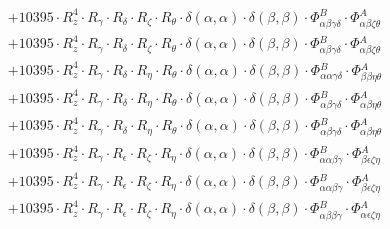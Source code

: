 \documentclass{article}
\begin{document}
\begin{subequations}
\begin{gather}
\begin{array}{c}
 \\[0.2em] 		 + 10395 \cdot R_{z}^{4} \cdot R_{\gamma{}} \cdot R_{\delta{}} \cdot R_{\zeta{}} \cdot R_{\theta{}} \cdot \delta{}\left(\alpha{}, \alpha{}\right) \cdot \delta{}\left(\beta{}, \beta{}\right) \cdot \Phi{}^{B}_{\alpha{}\beta{}\gamma{}\delta{}} \cdot \Phi{}^{A}_{\alpha{}\beta{}\zeta{}\theta{}} 
 \\[0.2em] 		 + 10395 \cdot R_{z}^{4} \cdot R_{\gamma{}} \cdot R_{\delta{}} \cdot R_{\zeta{}} \cdot R_{\theta{}} \cdot \delta{}\left(\alpha{}, \alpha{}\right) \cdot \delta{}\left(\beta{}, \beta{}\right) \cdot \Phi{}^{B}_{\alpha{}\beta{}\gamma{}\delta{}} \cdot \Phi{}^{A}_{\alpha{}\beta{}\zeta{}\theta{}} 
 \\[0.2em] 		 + 10395 \cdot R_{z}^{4} \cdot R_{\gamma{}} \cdot R_{\delta{}} \cdot R_{\eta{}} \cdot R_{\theta{}} \cdot \delta{}\left(\alpha{}, \alpha{}\right) \cdot \delta{}\left(\beta{}, \beta{}\right) \cdot \Phi{}^{B}_{\alpha{}\alpha{}\gamma{}\delta{}} \cdot \Phi{}^{A}_{\beta{}\beta{}\eta{}\theta{}} 
 \\[0.2em] 		 + 10395 \cdot R_{z}^{4} \cdot R_{\gamma{}} \cdot R_{\delta{}} \cdot R_{\eta{}} \cdot R_{\theta{}} \cdot \delta{}\left(\alpha{}, \alpha{}\right) \cdot \delta{}\left(\beta{}, \beta{}\right) \cdot \Phi{}^{B}_{\alpha{}\beta{}\gamma{}\delta{}} \cdot \Phi{}^{A}_{\alpha{}\beta{}\eta{}\theta{}} 
 \\[0.2em] 		 + 10395 \cdot R_{z}^{4} \cdot R_{\gamma{}} \cdot R_{\delta{}} \cdot R_{\eta{}} \cdot R_{\theta{}} \cdot \delta{}\left(\alpha{}, \alpha{}\right) \cdot \delta{}\left(\beta{}, \beta{}\right) \cdot \Phi{}^{B}_{\alpha{}\beta{}\gamma{}\delta{}} \cdot \Phi{}^{A}_{\alpha{}\beta{}\eta{}\theta{}} 
 \\[0.2em] 		 + 10395 \cdot R_{z}^{4} \cdot R_{\gamma{}} \cdot R_{\epsilon{}} \cdot R_{\zeta{}} \cdot R_{\eta{}} \cdot \delta{}\left(\alpha{}, \alpha{}\right) \cdot \delta{}\left(\beta{}, \beta{}\right) \cdot \Phi{}^{B}_{\alpha{}\alpha{}\beta{}\gamma{}} \cdot \Phi{}^{A}_{\beta{}\epsilon{}\zeta{}\eta{}} 
 \\[0.2em] 		 + 10395 \cdot R_{z}^{4} \cdot R_{\gamma{}} \cdot R_{\epsilon{}} \cdot R_{\zeta{}} \cdot R_{\eta{}} \cdot \delta{}\left(\alpha{}, \alpha{}\right) \cdot \delta{}\left(\beta{}, \beta{}\right) \cdot \Phi{}^{B}_{\alpha{}\alpha{}\beta{}\gamma{}} \cdot \Phi{}^{A}_{\beta{}\epsilon{}\zeta{}\eta{}} 
 \\[0.2em] 		 + 10395 \cdot R_{z}^{4} \cdot R_{\gamma{}} \cdot R_{\epsilon{}} \cdot R_{\zeta{}} \cdot R_{\eta{}} \cdot \delta{}\left(\alpha{}, \alpha{}\right) \cdot \delta{}\left(\beta{}, \beta{}\right) \cdot \Phi{}^{B}_{\alpha{}\beta{}\beta{}\gamma{}} \cdot \Phi{}^{A}_{\alpha{}\epsilon{}\zeta{}\eta{}} 

\end{array}
\end{gather}
\end{subequations}
\end{document}
